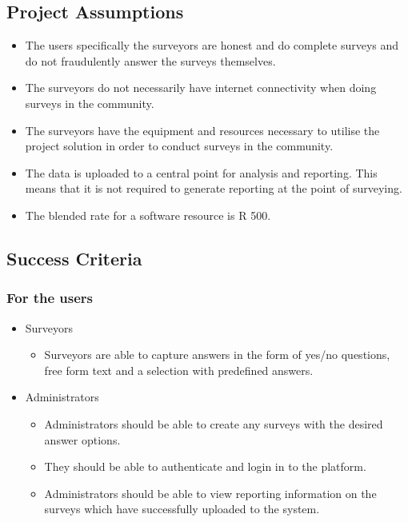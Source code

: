 \documentclass[12pt]{witseiepaper}
\begin{document}
\subsection{Project Assumptions}
\begin{itemize}
  \item The users specifically the surveyors are honest and do complete surveys and do not fraudulently answer the surveys themselves.
  \item The surveyors do not necessarily have internet connectivity when doing surveys in the community.
  \item The surveyors have the equipment and resources necessary to utilise the project solution in order to conduct surveys in the community.
  \item The data is uploaded to a central point for analysis and reporting. This means that it is not required to generate reporting at the point of surveying.
  \item The blended rate for a software resource is R 500.
\end{itemize}

\subsection{Success Criteria}
\subsubsection{For the users}
\begin{itemize}
  \item Surveyors \begin{itemize}
  \item Surveyors are able to capture answers in the form of yes/no questions, free form text and a selection with predefined answers.
  \end{itemize}
    \item Administrators \begin{itemize}
  \item Administrators should be able to create any surveys with the desired answer options.
  \item They should be able to authenticate and login in to the platform.
  \item Administrators should be able to view reporting information on the surveys which have successfully uploaded to the system.
  \end{itemize}

\end{itemize}
\end{document}
